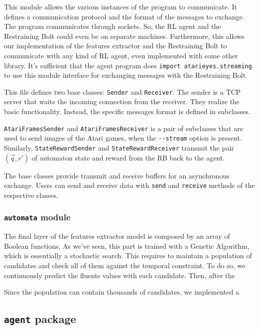 This module allows the various instances of the program to communicate. It
defines a communication protocol and the format of the messages to exchange.
The program communicates through sockets. So, the RL agent and the Restraining
Bolt could even be on separate machines. Furthermore, this allows our
implementation of the features extractor and the Restraining Bolt to
communicate with any kind of RL agent, even implemented with some other
library. It's sufficient that the agent program does
\lstinline[style=inlinepy]|import atarieyes.streaming| to use this module
interface for exchanging messages with the Restraining Bolt.

This file defines two base classes: \texttt{Sender} and \texttt{Receiver}.
The sender is a TCP server that waits the incoming connection from the
receiver. They realize the basic functionality. Instead, the specific messages
format is defined in subclasses.

\texttt{AtariFramesSender} and \texttt{AtariFramesReceiver} is a pair of
subclasses that are used to send images of the Atari games, when the
\verb|--stream| option is present. Similarly, \texttt{StateRewardSender} and
\texttt{StateRewardReceiver} transmit the pair $(\vec{q}, r')$ of automaton
state and reward from the RB back to the agent.

The base classes provide transmit and receive buffers for an asynchronous
exchange. Users can send and receive data with \texttt{send} and
\texttt{receive} methods of the respective classes.


\subsubsection*{\texttt{automata} module}

The final layer of the features extractor model is composed by an array of
Boolean functions. As we've seen, this part is trained with a Genetic
Algorithm, which is essentially a stochastic search. This requires to maintain
a population of candidates and check all of them against the temporal
constraint. To do so, we continuously predict the fluents values with each
candidate. Then, after the 

Since the population can contain thousands of candidates, we implemented a



\subsection{\texttt{agent} package}

\label{sec:impl-agent}


